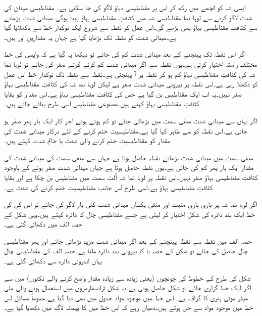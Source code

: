 	ایسی شہ کو لچھے میں رکھ کر اس پر مقناطیسی دباؤ لاگو کی جا سکتی ہے۔ مقناطیسی میدان کی شدت   لاگو کرنے سے لوہا نما مقناطیسی شہ میں کثافتِ مقناطیسی بہاؤ   پیدا ہوگی۔میدانی شدت بڑھانے سے کثافتِ مقناطیسی بہاؤ بھی بڑھے گی۔اس عمل کو نقطہ   سے شروع ایک نوکدار خط سے دکھلایا گیا ہے۔میدانی شدت کو نقطہ   تک بڑھایا گیا ہے جہاں یہ مقداریں   اور  ہیں۔

	اگر اس نقطہ تک پہنچنے کے بعد میدانی شدت کم کی جائے تو دیکھا یہ گیا ہے کہ واپسی کی خط مختلف راستہ اختیار کرتی ہے۔یوں نقطہ   سے اگر میدانی شدت کم کرتے کرتے صفر کی جائے تو لوہا نما شہ کی کثافتِ مقناطیسی بہاؤ کم ہو کر نقطہ  پر آ پہنچتی ہے۔نقطہ  سے نقطہ  تک نوکدار خط اس عمل کو دکھلا رہی ہے۔اس نقطہ پر بیرونی میدانی شدت صفر ہے لیکن لوہا نما شہ کی کثافتِ مقناطیسی بہاؤ صفر نہیں۔یہ اب ایک مقناطیس بن گیا ہے جس کی کثافتِ مقناطیسی بہاؤ   ہے۔اس مقدار کو بقایا کثافتِ مقناطیسی بہاؤ  کہتے ہیں۔مصنوعی مقناطیس اسی طرح بنائے جاتے ہیں۔

اگر یہاں سے میدانی شدت منفی سمت میں بڑھائی جائے تو  کم ہوتے ہوتے آخر کار ایک بار پھر صفر ہو جاتی ہے۔اس نقطہ کو  سے ظاہر کیا گیا ہے۔مقناطیسیت ختم کرنے کے لئے درکار میدانی شدت کی مقدار   کو مقناطیسیت ختم کرنے والی شدت یا خاتم شدت کہتے ہیں۔

منفی سمت میں میدانی شدت بڑھاتے نقطہ  حاصل ہوتا ہے جہاں سے منفی سمت کی میدانی شدت کی مقدار ایک بار پھر کم کی جاتی ہے۔یوں نقطہ  حاصل ہوتا ہے جہاں میدانی شدت صفر ہونے کے باوجود کثافتِ مقناطیسی بہاؤ صفر نہیں۔اس نقطہ پر لوہا نما شہ اُلٹ سمت میں مقناطیس بن چکا ہے اور  بقایا کثافتِ مقناطیسی بہاؤ ہے۔اسی طرح اس جانب مقناطیسیت ختم کرنے کی شدت  ہے۔

اگر لوہا نما شہ پر باری باری مثبت اور منفی  یکساں میدانی شدت کئی بار لاگو کی جائے تو اس کی   کی خط ایک بند دائرہ کی شکل اختیار کر لیتی ہے جسے مقناطیسی چال کا دائرہ  کہتے ہیں۔یہی شکل کے حصہ الف میں دکھائی گئی ہے۔

حصہ الف میں نقطہ   سے نقطہ   پہنچنے کے بعد اگر میدانی شدت مزید بڑھائی جائے اور پھر مقناطیسی چال حاصل کی جائے تو شکل کے حصہ با کا بیرونی بند دائرہ ملتا ہے۔حصہ الف کی مقناطیسی چال یہاں اندرونی دائرہ سے دکھائی گئی ہے۔

شکل   کی طرح کے خطوط کی چونچوں (یعنی زیادہ سے زیادہ مقدار واضح کرنے والے نکتوں) میں سے اگر ایک خط گزاری جائے تو شکل   حاصل ہوتی ہے۔یہ شکل ٹرانسفارمروں میں استعمال ہونے والی    ملی میٹر موٹی  پتری کا گراف ہے۔ اس خط میں موجود مواد جدول   میں بھی دیا گیا ہے۔عموماً مسائل اس خط میں موجود مواد سے حل ہوتے ہیں۔دھیان رہے کہ اس خط میں   کا پیمانہ لاگ میں دکھایا گیا ہے۔

